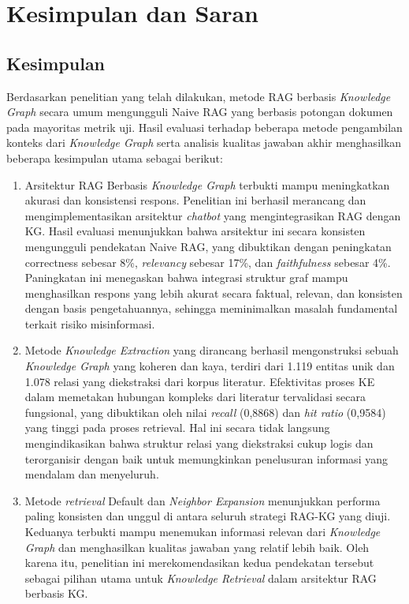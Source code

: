 \chapter{Kesimpulan dan Saran}
\section{Kesimpulan}
Berdasarkan penelitian yang telah dilakukan, metode RAG berbasis \textit{Knowledge Graph} secara umum mengungguli Naive RAG yang berbasis potongan dokumen pada mayoritas metrik uji.
Hasil evaluasi terhadap beberapa metode pengambilan konteks dari \textit{Knowledge Graph} serta analisis kualitas jawaban akhir menghasilkan beberapa kesimpulan utama sebagai berikut:

\begin{enumerate}
      \item Arsitektur RAG Berbasis \textit{Knowledge Graph} terbukti mampu meningkatkan akurasi dan konsistensi respons.
            Penelitian ini berhasil merancang dan mengimplementasikan arsitektur \textit{chatbot} yang mengintegrasikan RAG dengan KG.
            Hasil evaluasi menunjukkan bahwa arsitektur ini secara konsisten mengungguli pendekatan Naive RAG, yang dibuktikan dengan peningkatan \textlatin{correctness} sebesar 8\%, \textit{relevancy} sebesar 17\%, dan \textit{faithfulness} sebesar 4\%.
            Paningkatan ini menegaskan bahwa integrasi struktur graf mampu menghasilkan respons yang lebih akurat secara faktual, relevan, dan konsisten dengan basis pengetahuannya, sehingga meminimalkan masalah fundamental terkait risiko misinformasi.

      \item Metode \textit{Knowledge Extraction} yang dirancang berhasil mengonstruksi sebuah \textit{Knowledge Graph} yang koheren dan kaya, terdiri dari 1.119 entitas unik dan 1.078 relasi yang diekstraksi dari korpus literatur.
            Efektivitas proses KE dalam memetakan hubungan kompleks dari literatur tervalidasi secara fungsional, yang dibuktikan oleh nilai \textit{recall} (0,8868) dan \textit{hit ratio} (0,9584) yang tinggi pada proses retrieval.
            Hal ini secara tidak langsung mengindikasikan bahwa struktur relasi yang diekstraksi cukup logis dan terorganisir dengan baik untuk memungkinkan penelusuran informasi yang mendalam dan menyeluruh.

      \item Metode \textit{retrieval} Default dan \textit{Neighbor Expansion} menunjukkan performa paling konsisten dan unggul di antara seluruh strategi RAG-KG yang diuji.
            Keduanya terbukti mampu menemukan informasi relevan dari \textit{Knowledge Graph} dan menghasilkan kualitas jawaban yang relatif lebih baik.
            Oleh karena itu, penelitian ini merekomendasikan kedua pendekatan tersebut sebagai pilihan utama untuk \textit{Knowledge Retrieval} dalam arsitektur RAG berbasis KG.
\end{enumerate}

